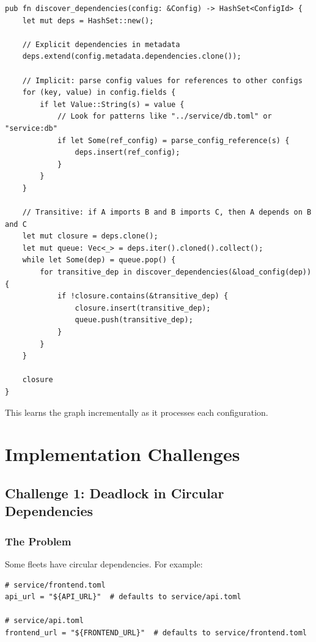 \begin{lstlisting}[caption={Adaptive dependency graph learning}]
pub fn discover_dependencies(config: &Config) -> HashSet<ConfigId> {
    let mut deps = HashSet::new();

    // Explicit dependencies in metadata
    deps.extend(config.metadata.dependencies.clone());

    // Implicit: parse config values for references to other configs
    for (key, value) in config.fields {
        if let Value::String(s) = value {
            // Look for patterns like "../service/db.toml" or "service:db"
            if let Some(ref_config) = parse_config_reference(s) {
                deps.insert(ref_config);
            }
        }
    }

    // Transitive: if A imports B and B imports C, then A depends on B and C
    let mut closure = deps.clone();
    let mut queue: Vec<_> = deps.iter().cloned().collect();
    while let Some(dep) = queue.pop() {
        for transitive_dep in discover_dependencies(&load_config(dep)) {
            if !closure.contains(&transitive_dep) {
                closure.insert(transitive_dep);
                queue.push(transitive_dep);
            }
        }
    }

    closure
}
\end{lstlisting}

This learns the graph incrementally as it processes each configuration.

\section{Implementation Challenges}

\subsection{Challenge 1: Deadlock in Circular Dependencies}

\subsubsection{The Problem}

Some fleets have circular dependencies. For example:

\begin{lstlisting}[caption={Circular dependency in fleet}]
# service/frontend.toml
api_url = "${API_URL}"  # defaults to service/api.toml

# service/api.toml
frontend_url = "${FRONTEND_URL}"  # defaults to service/frontend.toml
\end{lstlisting}

